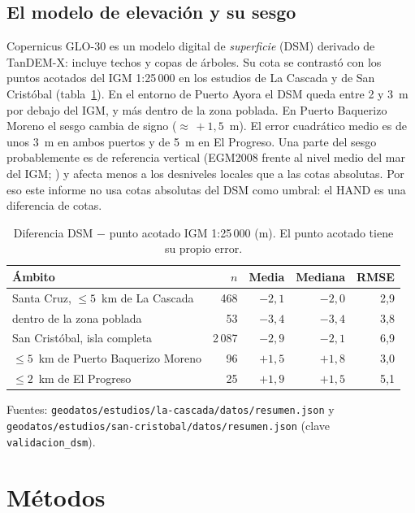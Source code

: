 \documentclass{sosg-informe}
\begin{document}
\subsection{El modelo de elevación y su sesgo}\label{sec:dsm}
Copernicus GLO-30 es un modelo digital de \emph{superficie} (DSM) derivado de TanDEM-X: incluye techos y copas de árboles. Su cota se contrastó con los puntos acotados del IGM 1:25\,000 en los estudios de La Cascada y de San Cristóbal (tabla~\ref{tab:dsm}). En el entorno de Puerto Ayora el DSM queda entre 2 y 3~m por debajo del IGM, y más dentro de la zona poblada. En Puerto Baquerizo Moreno el sesgo cambia de signo (${\approx}\,+1{,}5$~m). El error cuadrático medio es de unos 3~m en ambos puertos y de 5~m en El Progreso. Una parte del sesgo probablemente es de referencia vertical (EGM2008 frente al nivel medio del mar del IGM; ) y afecta menos a los desniveles locales que a las cotas absolutas. Por eso este informe no usa cotas absolutas del DSM como umbral: el HAND es una diferencia de cotas.

\begin{table}[ht]
  \centering\small
  \caption{Diferencia DSM $-$ punto acotado IGM 1:25\,000 (m). El punto acotado tiene su propio error.}
  \label{tab:dsm}
  \begin{tabular}{lrrrr}
    \toprule
    Ámbito & $n$ & Media & Mediana & RMSE \\
    \midrule
    Santa Cruz, $\leq 5$~km de La Cascada & 468 & $-2{,}1$ & $-2{,}0$ & 2,9 \\
    \quad dentro de la zona poblada & 53 & $-3{,}4$ & $-3{,}4$ & 3,8 \\
    San Cristóbal, isla completa & 2\,087 & $-2{,}9$ & $-2{,}1$ & 6,9 \\
    \quad $\leq 5$~km de Puerto Baquerizo Moreno & 96 & $+1{,}5$ & $+1{,}8$ & 3,0 \\
    \quad $\leq 2$~km de El Progreso & 25 & $+1{,}9$ & $+1{,}5$ & 5,1 \\
    \bottomrule
  \end{tabular}
  \par\vspace{3pt}\raggedright\footnotesize Fuentes: \texttt{geodatos/estudios/la-cascada/datos/resumen.json} y \texttt{geodatos/estudios/san-cristobal/datos/resumen.json} (clave \texttt{validacion\_dsm}).
\end{table}

\section{Métodos}
\end{document}
